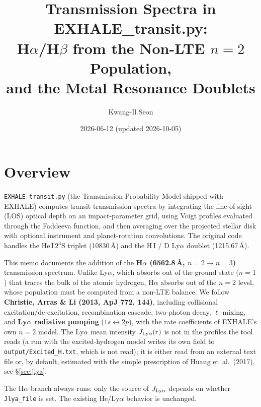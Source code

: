 \documentclass[english,a4paper]{my_memo}
\begin{document}
\title{Transmission Spectra in EXHALE\_transit.py:\\
H$\alpha$/H$\beta$ from the Non-LTE $n=2$ Population,\\
and the Metal Resonance Doublets}
\author{Kwang-Il Seon}
\date{2026-06-12 (updated 2026-10-05)}
\maketitle

\tableofcontents
\bigskip

\section{Overview}

\texttt{EXHALE\_transit.py} (the Transmission Probability Model shipped with EXHALE)
computes transit transmission spectra by integrating the line-of-sight
(LOS) optical depth on an impact-parameter grid, using Voigt profiles
evaluated through the Faddeeva function, and then averaging over the
projected stellar disk with optional instrument and planet-rotation
convolutions. The original code handles the He\,I\,$2^3$S triplet
(10830\,\AA{}) and the H\,I / D Ly$\alpha$ doublet (1215.67\,\AA{}).

This memo documents the addition of the \textbf{H$\alpha$
(6562.8\,\AA{}, $n=2\to n=3$)} transmission spectrum. Unlike Ly$\alpha$,
which absorbs out of the ground state ($n=1$) that traces the bulk of
the atomic hydrogen, H$\alpha$ absorbs out of the $n=2$ level, whose
population must be computed from a non-LTE balance. We follow
\textbf{Christie, Arras \& Li (2013, ApJ 772, 144)}, including
collisional excitation/de-excitation, recombination cascade, two-photon
decay, $\ell$-mixing, and \textbf{Ly$\alpha$ radiative pumping}
($1s\leftrightarrow2p$), with the rate coefficients of EXHALE's own
$n=2$ model. The Ly$\alpha$ mean intensity $J_{\rm Ly\alpha}(r)$ is not in
the profiles the tool reads (a run with the excited-hydrogen model writes
its own field to \texttt{output/Excited\_H.txt}, which is not read); it is
either read from an external text file or, by default, estimated with the
simple prescription of Huang et~al.~(2017), see \S\ref{sec:jlya}.

The H$\alpha$ branch always runs; only the source of $J_{\rm Ly\alpha}$
depends on whether \texttt{Jlya\_file} is set. The existing He/Ly$\alpha$
behavior is unchanged.
\end{document}
